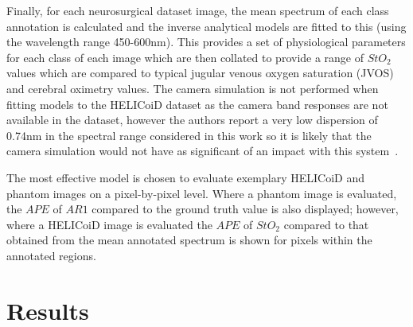 Finally, for each neurosurgical dataset image, the mean spectrum of each class annotation is calculated and the inverse analytical models are fitted to this (using the wavelength range 450-600nm). This provides a set of physiological parameters for each class of each image which are then collated to provide a range of $StO_2$ values which are compared to typical jugular venous oxygen saturation (JVOS) and cerebral oximetry values. The camera simulation is not performed when fitting models to the HELICoiD dataset as the camera band responses are not available in the dataset, however the authors report a very low dispersion of 0.74nm in the spectral range considered in this work so it is likely that the camera simulation would not have as significant of an impact with this system~\citep{Fabelo2018}. %

The most effective model is chosen to evaluate exemplary HELICoiD and phantom images on a pixel-by-pixel level. Where a phantom image is evaluated, the $APE$ of $AR1$ compared to the ground truth value is also displayed; however, where a HELICoiD image is evaluated the $APE$ of $StO_2$ compared to that obtained from the mean annotated spectrum is shown for pixels within the annotated regions. 

\section{Results}

